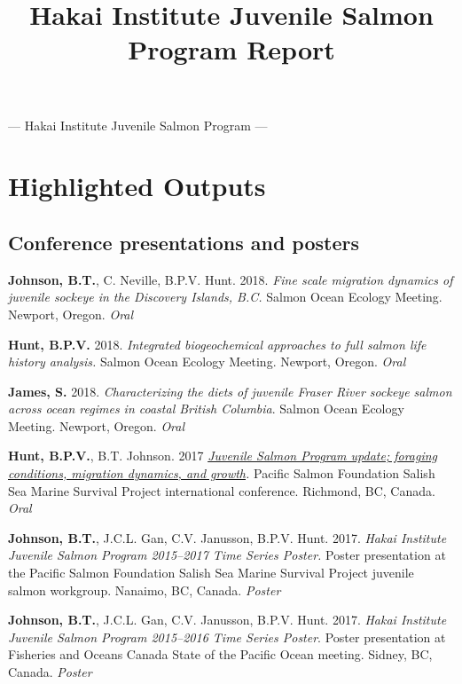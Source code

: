 \documentclass[12pt,]{article}
\title{Hakai Institute Juvenile Salmon Program Report}
\author{}
\date{}
\begin{document}
\maketitle

\begin{center}
\large
— Hakai Institute Juvenile Salmon Program —
\end{center}

\section{Highlighted Outputs}\label{highlighted-outputs}

\subsection{Conference presentations and
posters}\label{conference-presentations-and-posters}

\textbf{Johnson, B.T.}, C. Neville, B.P.V. Hunt. 2018. \emph{Fine scale
migration dynamics of juvenile sockeye in the Discovery Islands, B.C.}
Salmon Ocean Ecology Meeting. Newport, Oregon. \emph{Oral}

\textbf{Hunt, B.P.V.} 2018. \emph{Integrated biogeochemical approaches
to full salmon life history analysis.} Salmon Ocean Ecology Meeting.
Newport, Oregon. \emph{Oral}

\textbf{James, S.} 2018. \emph{Characterizing the diets of juvenile
Fraser River sockeye salmon across ocean regimes in coastal British
Columbia}. Salmon Ocean Ecology Meeting. Newport, Oregon. \emph{Oral}

\textbf{Hunt, B.P.V.}, B.T. Johnson. 2017
\emph{\href{https://speakerdeck.com/brettjohnson/psf-ssmsp-2017}{Juvenile
Salmon Program update; foraging conditions, migration dynamics, and
growth}.} Pacific Salmon Foundation Salish Sea Marine Survival Project
international conference. Richmond, BC, Canada. \emph{Oral}

\textbf{Johnson, B.T.}, J.C.L. Gan, C.V. Janusson, B.P.V. Hunt. 2017.
\emph{Hakai Institute Juvenile Salmon Program 2015--2017 Time Series
Poster.} Poster presentation at the Pacific Salmon Foundation Salish Sea
Marine Survival Project juvenile salmon workgroup. Nanaimo, BC, Canada.
\emph{Poster}

\textbf{Johnson, B.T.}, J.C.L. Gan, C.V. Janusson, B.P.V. Hunt. 2017.
\emph{Hakai Institute Juvenile Salmon Program 2015--2016 Time Series
Poster}. Poster presentation at Fisheries and Oceans Canada State of the
Pacific Ocean meeting. Sidney, BC, Canada. \emph{Poster}
\end{document}

